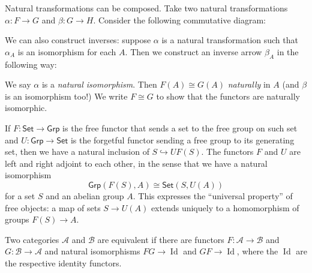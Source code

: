 Natural transformations can be composed. Take two natural transformations $\alpha \colon F \to G$ and $\beta \colon G \to H$. Consider the following commutative diagram: 
            \begin{figure}[H]
                \centering
            \end{figure}
    We can also construct inverses: suppose $\alpha$ is a natural transformation such that $\alpha_A$ is an isomorphism for each $A$. Then we construct an inverse arrow $\beta_A$ in the following way:
            \begin{figure}[H]
                \centering
            \end{figure}
            We say $\alpha$ is a \emph{natural isomorphism}. Then $F(A)\cong G(A)$ \emph{naturally} in $A$ (and $\beta$ is an isomorphism too!) We write $F\cong G$ to show that the functors are naturally isomorphic.
\begin{example}
    If $F \colon \mathsf{Set} \to \mathsf{Grp}$ is the free functor that sends a set to the free group on such set and $U \colon \mathsf{Grp} \to \mathsf{Set}$ is the forgetful functor sending a free group to its generating set, then we have a natural inclusion of $S\hookrightarrow UF(S)$. The functors $F$ and $U$ are left and right adjoint to each other, in the sense that we have a natural isomorphism \[
        \mathsf{Grp}(F(S),A)\cong \mathsf{Set}(S,U(A))
    \] for a set $S$ and an abelian group $A$. This expresses the ``universal property'' of free objects: a map of sets $S\to U(A)$ extends uniquely to a homomorphism of groups $F(S)\to A$. 
\end{example}
\begin{definition}
    Two categories $\mathcal{A}$ and $\mathcal{B}$ are equivalent if there are functors $F \colon \mathcal{A} \to \mathcal{B}$ and $G \colon \mathcal{B} \to \mathcal{A}$ and natural isomorphisms $FG \to \operatorname{Id}$ and $GF \to \operatorname{Id}$, where the $\operatorname{Id}$ are the respective identity functors.
\end{definition}


